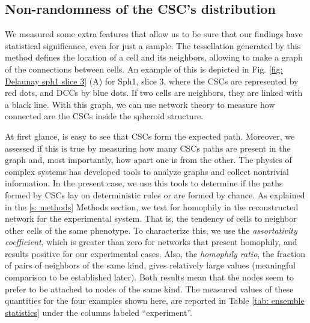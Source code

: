 \documentclass[fleqn,10pt]{wlscirep}
\begin{document}
\subsection*{Non-randomness of the CSC's distribution}

We measured some extra features that allow us to be sure that our findings have statistical significance, even for just a sample. The tessellation generated by this method defines the location of a cell and its neighbors, allowing to make a graph of the connections between cells. An example of this is depicted in Fig. \ref{fig: Delaunay sph1 slice 3} (A) for {\textsf Sph1, slice 3}, where the CSCs are represented by red dots, and DCCs by blue dots. If two cells are neighbors, they are linked with a black line. With this graph, we can use network theory to measure how connected are the CSCs inside the spheroid structure. 

At first glance, is easy to see that CSCs form the expected path. Moreover, we assessed if this is true by measuring how many CSCs paths are present in the graph and, most importantly, how apart one is from the other. The physics of complex systems has developed tools to analyze graphs and collect nontrivial information. In the present case, we use this tools to determine if the paths formed by CSCs lay on  deterministic rules or are formed by chance. As explained in the \ref{s: methods} Methods section, we test for homophily in the reconstructed network for the experimental system. That is, the tendency of cells to neighbor other cells of the same phenotype. To characterize this, we use the \emph{assortativity coefficient}, which is greater than zero for networks that present homophily, and results positive for our experimental cases. Also, the \emph{homophily ratio}, the fraction of pairs of neighbors of the same kind, gives relatively large values (meaningful comparison to be established later).  Both results mean that the nodes seem to prefer to be attached to nodes of the same kind. The measured values of these quantities for the four examples shown here, are reported in Table \ref{tab: ensemble statistics} under the columns labeled ``experiment''.   
\end{document}
